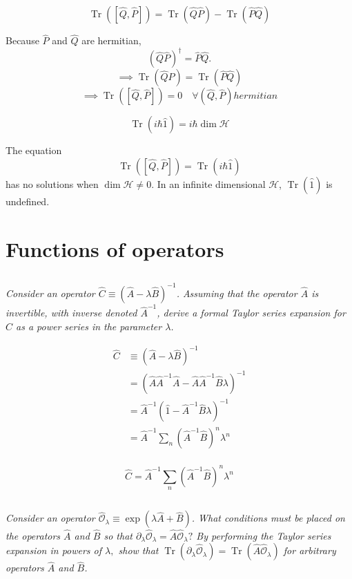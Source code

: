 \documentclass[12pt, letterpaper]{article}
\begin{document}
$$
\operatorname{Tr}\left(\left[\hat{Q} , \hat{P}\right]\right)=\operatorname{Tr}(\hat{Q} \hat{P})-\operatorname{Tr}(\hat{P} \hat{Q})
$$

Because $\hat P$ and $\hat Q$ are hermitian, 
$$
\left(\hat Q \hat P\right)^\dagger = \hat P \hat Q. 
$$
$$
\implies \operatorname{Tr}(\hat{Q} \hat{P})=\operatorname{Tr}(\hat{P} \hat{Q})
$$
$$
\implies \operatorname{Tr}\left(\left[\hat{Q} , \hat{P}\right]\right) = 0 \quad \forall(\hat Q, \hat P) hermitian
$$

$$ 
\operatorname{Tr}\left(i \hbar \hat 1\right) = i\hbar \dim \mathcal{H}
$$

The equation
$$
 \operatorname{Tr}\left(\left[\hat{Q} , \hat{P}\right]\right) = \operatorname{Tr}\left(i \hbar \hat 1\right)
$$
has no solutions when $ \dim \mathcal{H} \neq 0$. In an infinite dimensional $\mathcal{H}$, $\operatorname{Tr}\left(\hat 1\right)$ is undefined. 


\section{Functions of operators}
\subsection{}
\textit{Consider an operator $\hat{C} \equiv(\hat{A}-\lambda \hat{B})^{-1}$. Assuming that the operator $\hat{A}$ is invertible, with inverse denoted $\hat{A}^{-1}$, derive a formal Taylor series expansion for $\hat{C}$ as a power series in the parameter $\lambda$.}
 
\begin{align*}
\hat C &\equiv \left(\hat A - \lambda \hat B \right)^{-1} \\
& = \left(\hat{A} \hat{A}^{-1} \hat{A}-\hat{A} \hat{A}^{-1} \hat{B} \lambda\right)^{-1}\\
& = \hat{A}^{-1} \left(\hat 1 -  \hat{A}^{-1} \hat{B} \lambda\right)^{-1}\\
& = \hat{A}^{-1} \sum_n \left(\hat{A}^{-1} \hat{B}\right)^n \lambda^n\\
\end{align*}

\begin{equation*}
    \boxed{\hat C= \hat{A}^{-1} \sum_n \left(\hat{A}^{-1} \hat{B}\right)^n \lambda^n}
\end{equation*}

\subsection{}
\textit{Consider an operator $\hat{\mathcal{O}}_{\lambda} \equiv \exp(\lambda \hat{A}+\hat{B})$. What conditions must be placed on the operators $\hat{A}$ and $\hat{B}$ so that $\partial_{\lambda} \hat{\mathcal{O}}_{\lambda}=\hat{A} \hat{\mathcal{O}}_{\lambda} ?$ By performing the Taylor series expansion in powers of $\lambda,$ show that $\operatorname{Tr}\left(\partial_{\lambda} \hat{\mathcal{O}}_{\lambda}\right)=\operatorname{Tr}\left(\hat{A} \hat{\mathcal{O}}_{\lambda}\right)$ for
arbitrary operators $\hat{A}$ and $\hat{B}$.}
\end{document}
